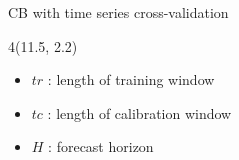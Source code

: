 \documentclass[
  12pt,
  ignorenonframetext,
  aspectratio=169,
]{beamer}
\begin{document}
\begin{frame}{CB with time series cross-validation}
\label{cb-with-time-series-cross-validation}

\begin{textblock}{4}(11.5, 2.2)
\fontsize{11}{12}\sf
\begin{block}{}
  \begin{itemize}
  \item \color{violet} {$tr$} : \color{black} length of training window \newline
  \item \color{violet} {$tc$} : \color{black} length of calibration window \newline
  \item \color{violet} {$H$} : \color{black} forecast horizon \newline
\end{itemize}
\end{block}
\end{textblock}
\end{frame}
\end{document}
